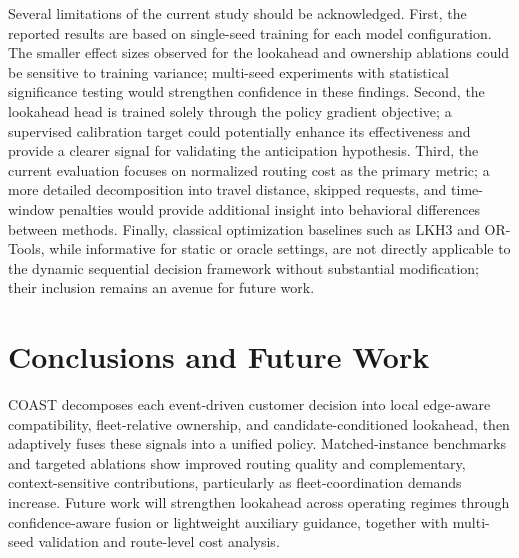 \documentclass[letterpaper]{article}
\begin{document}
Several limitations of the current study should be acknowledged. First, the reported results are based on single-seed training for each model configuration. The smaller effect sizes observed for the lookahead and ownership ablations could be sensitive to training variance; multi-seed experiments with statistical significance testing would strengthen confidence in these findings. Second, the lookahead head is trained solely through the policy gradient objective; a supervised calibration target could potentially enhance its effectiveness and provide a clearer signal for validating the anticipation hypothesis. Third, the current evaluation focuses on normalized routing cost as the primary metric; a more detailed decomposition into travel distance, skipped requests, and time-window penalties would provide additional insight into behavioral differences between methods. Finally, classical optimization baselines such as LKH3 and OR-Tools, while informative for static or oracle settings, are not directly applicable to the dynamic sequential decision framework without substantial modification; their inclusion remains an avenue for future work.


\fi

\section{Conclusions and Future Work} \label{sec:futurework}
COAST decomposes each event-driven customer decision into local edge-aware compatibility, fleet-relative ownership, and candidate-conditioned lookahead, then adaptively fuses these signals into a unified policy. Matched-instance benchmarks and targeted ablations show improved routing quality and complementary, context-sensitive contributions, particularly as fleet-coordination demands increase. Future work will strengthen lookahead across operating regimes through confidence-aware fusion or lightweight auxiliary guidance, together with multi-seed validation and route-level cost analysis.
\raggedbottom

\end{document}
